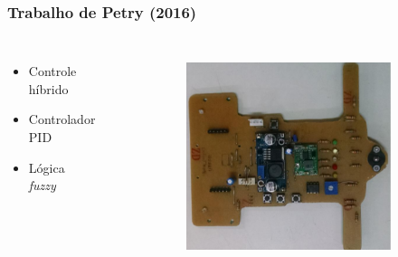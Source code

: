 \begin{frame}
\frametitle{Trabalho de Petry (2016)}
\begin{columns}
	\begin{itemize}
	\item Controle híbrido
	\item Controlador PID
	\item Lógica \textit{fuzzy}
	\end{itemize}
	
	\begin{figure}[h]
     \centering
     \captionsetup{width=0.9\textwidth,font=footnotesize,textfont=bf}
     \begin{subfigure}[b]{0.4\textwidth}
 	\centering
         \includegraphics[width=1\textwidth,height=0.4\textheight]{Figuras/marcio1.png}
         \caption{\centering \label{fig:marcio1}}
     \end{subfigure}
	~     
     \begin{subfigure}[b]{0.4\textwidth}
 	\centering

\end{subfigure}
\end{figure}
\end{columns}
\end{frame}
